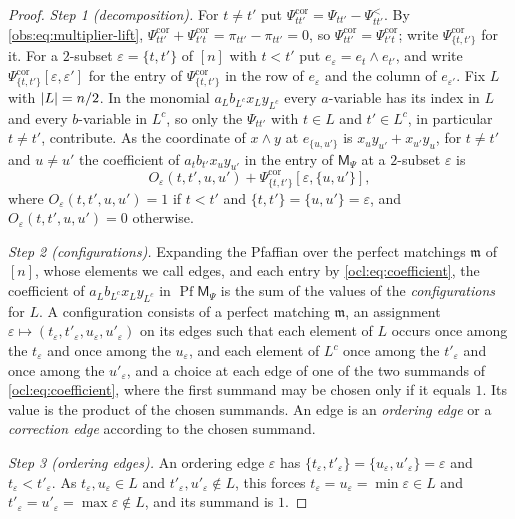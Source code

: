 \begin{proof}
\emph{Step 1 (decomposition).} For $t\ne t'$ put $\Psi^{\mathrm{cor}}_{tt'}=\Psi_{tt'}-\Psi^<_{tt'}$. By
\eqref{obs:eq:multiplier-lift}, $\Psi^{\mathrm{cor}}_{tt'}+\Psi^{\mathrm{cor}}_{t't}=\pi_{tt'}-\pi_{tt'}=0$, so
$\Psi^{\mathrm{cor}}_{tt'}=\Psi^{\mathrm{cor}}_{t't}$; write $\Psi^{\mathrm{cor}}_{\{t,t'\}}$ for it. For a $2$-subset
$\varepsilon=\{t,t'\}$ of $[n]$ with $t<t'$ put $e_\varepsilon=e_t\wedge e_{t'}$, and write
$\Psi^{\mathrm{cor}}_{\{t,t'\}}[\varepsilon,\varepsilon']$ for the entry of $\Psi^{\mathrm{cor}}_{\{t,t'\}}$ in the row of
$e_\varepsilon$ and the column of $e_{\varepsilon'}$. Fix $L$ with $\lvert L\rvert=n/2$. In the monomial $a_Lb_{L^c}x_Ly_{L^c}$
every $a$-variable has its index in $L$ and every $b$-variable in $L^c$, so only the $\Psi_{tt'}$ with $t\in L$ and
$t'\in L^c$, in particular $t\ne t'$, contribute. As the coordinate of $x\wedge y$ at $e_{\{u,u'\}}$ is
$x_uy_{u'}+x_{u'}y_u$, for $t\ne t'$ and $u\ne u'$ the coefficient of $a_tb_{t'}x_uy_{u'}$ in the entry of
$\mathsf M_\Psi$ at a $2$-subset $\varepsilon$ is
\begin{equation}\label{ocl:eq:coefficient}
O_\varepsilon(t,t',u,u')+\Psi^{\mathrm{cor}}_{\{t,t'\}}[\varepsilon,\{u,u'\}],
\end{equation}
where $O_\varepsilon(t,t',u,u')=1$ if $t<t'$ and $\{t,t'\}=\{u,u'\}=\varepsilon$, and $O_\varepsilon(t,t',u,u')=0$
otherwise.

\emph{Step 2 (configurations).} Expanding the Pfaffian over the perfect matchings $\mathfrak m$ of $[n]$, whose elements
we call edges, and each entry by \eqref{ocl:eq:coefficient}, the coefficient of $a_Lb_{L^c}x_Ly_{L^c}$ in
$\operatorname{Pf}\mathsf M_\Psi$ is the sum of the values of the \emph{configurations} for $L$. A configuration
consists of a perfect matching $\mathfrak m$, an assignment $\varepsilon\mapsto(t_\varepsilon,t'_\varepsilon,
u_\varepsilon,u'_\varepsilon)$ on its edges such that each element of $L$ occurs once among the $t_\varepsilon$ and once
among the $u_\varepsilon$, and each element of $L^c$ once among the $t'_\varepsilon$ and once among the
$u'_\varepsilon$, and a choice at each edge of one of the two summands of \eqref{ocl:eq:coefficient}, where the first
summand may be chosen only if it equals $1$. Its value is the product of the chosen summands. An edge is an
\emph{ordering edge} or a \emph{correction edge} according to the chosen summand.

\emph{Step 3 (ordering edges).} An ordering edge $\varepsilon$ has
$\{t_\varepsilon,t'_\varepsilon\}=\{u_\varepsilon,u'_\varepsilon\}=\varepsilon$ and $t_\varepsilon<t'_\varepsilon$. As
$t_\varepsilon,u_\varepsilon\in L$ and $t'_\varepsilon,u'_\varepsilon\notin L$, this forces
$t_\varepsilon=u_\varepsilon=\min\varepsilon\in L$ and $t'_\varepsilon=u'_\varepsilon=\max\varepsilon\notin L$, and its
summand is $1$.


\end{proof}
